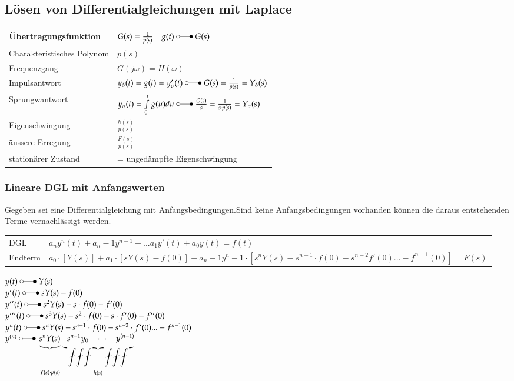 \subsection{Lösen von Differentialgleichungen mit Laplace}
\begin{minipage}{11.5cm}
	\begin{tabular}{| l | l |}
		\hline
		Übertragungsfunktion & $G(s) = \frac{1}{p(s)} \quad g(t) \; \laplace \; G(s)$\\
		\hline Charakteristisches Polynom & $p(s)$\\
		\hline
		Frequenzgang & $G(j\omega) = H(\omega)$ \\
		\hline
		Impulsantwort & $y_{\delta}(t) = g(t) = y_{\sigma}'(t) \; \laplace \; G(s) = \frac{1}{p(s)}=Y_{\delta}(s)$\\
		\hline
		Sprungwantwort & $y_{\sigma}(t)=\int\limits_0^t g(u) du \; \laplace \; \frac{G(s)}{s} = \frac{1}{s \cdot p(s)} = Y_{\sigma}(s)$\\
		\hline
		Eigenschwingung & $\frac{h(s)}{p(s)}$ \\
		\hline
		äussere Erregung & $\frac{F(s)}{p(s)}$ \\
		\hline
		stationärer Zustand & = ungedämpfte Eigenschwingung\\
		\hline
	\end{tabular}
\end{minipage}
\newpage
\subsubsection{Lineare DGL mit Anfangswerten}
Gegeben sei eine Differentialgleichung mit Anfangsbedingungen.Sind keine Anfangsbedingungen vorhanden können die daraus entstehenden Terme vernachlässigt werden.\\
\vspace{2pt}
\begin{tabular}{l l}
	DGL & $a_n y^{n}(t)+a_n-1 y^{n-1}+...a_1 y'(t)+a_0 y(t)=f(t)$\\
	Endterm & $a_0\cdot[Y(s)]+a_1 \cdot [sY(s)-f(0)]+a_n-1y^n-1 \cdot [s^nY(s)-s^{n-1} \cdot f(0)-s^{n-2}f'(0)...-f^{n-1}(0)]=F(s)$\\
\end{tabular}

\begin{minipage}{15cm}
	$y(t) \; \laplace \;  Y(s)$\\
	$y'(t) \; \laplace \; sY(s) - f(0)$\\
	$y''(t) \; \laplace \; s^2Y(s)-s\cdot f(0) - f'(0)$\\
	$y'''(t) \; \laplace \; s^3Y(s)-s^2\cdot f(0)-s \cdot f'(0) - f''(0)$\\
	$y^n(t) \; \laplace \; s^nY(s)-s^{n-1}\cdot f(0)-s^{n-2} \cdot f'(0) ...- f^{n-1}(0)$\\
	$y^{(n)} \; \laplace \; 
	\underbrace{s^nY(s)}_{Y(s) \cdot p(s)}
	\underbrace{-s^{n-1}y_0 - \dots - y^{(n-1)}}_{h(s)}$\\
\end{minipage}

\clearpage
\pagebreak